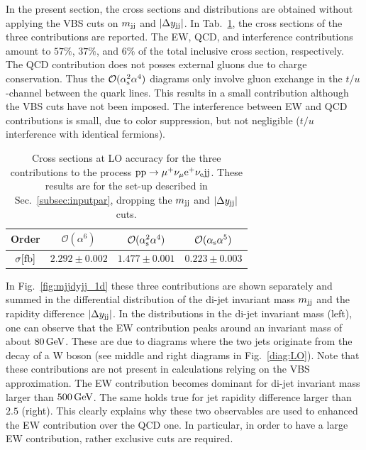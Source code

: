 In the present section, the cross sections and distributions are obtained without applying the VBS cuts on $m_{\text{j}\text{j}}$ and $|\Delta y_{\text{j}\text{j}}|$.
In Tab.~\ref{tab:LOscanXsec}, the cross sections of the three contributions are reported.
The EW, QCD, and interference contributions amount to $57\%$, $37\%$, and $6\%$ of the total inclusive cross section, respectively.
The QCD contribution does not posses external gluons due to charge conservation.
Thus the $\mathcal{O}(\alpha_\text{s}^2\alpha^4)$ diagrams only involve gluon exchange in the $t/u$-channel between the quark lines.
This results in a small contribution although the VBS cuts have not been imposed.
The interference between EW and QCD contributions is small, due to color suppression, but not negligible ($t/u$ interference with identical fermions).

\begin{table}[h!]
    \centering
    \begin{tabular}{c|c|c|c}
        Order & $\mathcal{O}(\alpha^6)$ & $\mathcal{O}(\alpha_\text{s}^2\alpha^4)$ & $\mathcal{O}(\alpha_\text{s}\alpha^5)$ \\
        \hline
        \hline
        $\sigma[\rm{fb}]$ & $ 2.292 \pm 0.002 $ & $ 1.477 \pm 0.001 $ & $ 0.223 \pm 0.003 $ \\
    \end{tabular}
    \caption{\label{tab:LOscanXsec} Cross sections at LO accuracy for the three contributions to the process ${\rm p}{\rm p}\to\mu^+\nu_\mu{\rm e}^+\nu_{\rm e}{\rm j}{\rm j}$.
    These results are for the set-up described in Sec.~\ref{subsec:inputpar}, dropping the $m_{\text{j}\text{j}}$ and $|\Delta y_{\text{j}\text{j}}|$ cuts.}
\end{table}

In Fig.~\ref{fig:mjjdyjj_1d} these three contributions are shown separately and summed in the differential distribution of the di-jet invariant mass $m_{\text{j}\text{j}}$ and the rapidity difference $|\Delta y_{\text{j}\text{j}}|$.
In the distributions in the di-jet invariant mass (left), one can observe that the EW contribution peaks around an invariant mass of about $80\,\text{GeV}$.
These are due to diagrams where the two jets originate from the decay of a W boson (see middle and right diagrams in Fig.~\ref{diag:LO}).
Note that these contributions are not present in calculations relying on the VBS approximation.
The EW contribution becomes dominant for di-jet invariant mass larger than $500\,\text{GeV}$.
The same holds true for jet rapidity difference larger than $2.5$ (right).
This clearly explains why these two observables are used to enhanced the EW contribution over the QCD one.
In particular, in order to have a large EW contribution, rather exclusive cuts are required.

